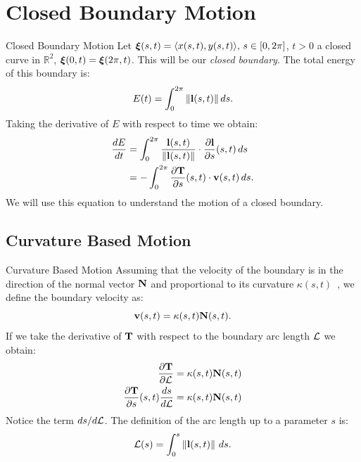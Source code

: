 \documentclass[usenames,dvipsnames]{beamer}
\begin{document}


\section{Closed Boundary Motion}
\begin{frame}{Closed Boundary Motion}
Let $\bm{\xi}(s,t) = \langle x(s,t), y(s,t) \rangle,\, s \in [0, 2\pi]$, $t >  0$ a closed curve in $\mathbb{R}^2$, \ie $\bm{\xi}(0, t) = \bm{\xi}(2\pi,t)$. This will be our \emph{closed boundary}. The total energy of this boundary is:
\begin{equation*}
    E(t) = \int_0^{2\pi} \left\lVert\mathbf{l}(s,t)\right\rVert ds.
\end{equation*}
Taking the derivative of $E$ with respect to time we obtain:
\begin{align*}
    \frac{dE}{dt} &= \int_0^{2\pi} \frac{\mathbf{l}(s,t)}{\left\lVert\mathbf{l}(s,t)\right\rVert}\cdot \frac{\partial \mathbf{l}}{\partial s}(s,t)\,ds\\
    &= -\int_0^{2\pi} \frac{\partial \mathbf{T}}{\partial s}(s,t)\cdot \mathbf{v}(s,t)\, ds.
\end{align*}
We will use this equation to understand the motion of a closed boundary.
\end{frame}

\subsection{Curvature Based Motion}
\begin{frame}{Curvature Based Motion}
Assuming that the velocity of the boundary is in the direction of the normal vector $\mathbf{N}$ and proportional to its curvature $\kappa(s,t)$~\cite{Kinderlehrer2006}, we define the boundary velocity as:
\begin{equation*}
    \mathbf{v}(s,t) = \kappa(s,t)\mathbf{N}(s,t).
\end{equation*}
If we take the derivative of $\mathbf{T}$ with respect to the boundary arc length $\mathcal{L}$ we obtain:
\begin{align}
    \frac{\partial \mathbf{T}}{\partial \mathcal{L}} &= \kappa(s,t)\mathbf{N}(s,t) \nonumber\\
    \frac{\partial \mathbf{T}}{\partial s}(s,t) \frac{ds}{d\mathcal{L}}&= \kappa(s,t)\mathbf{N}(s,t)
    \label{eq:dTds_dsdAL}
\end{align}
Notice the term $ds/d\mathcal{L}$. The definition of the arc length up to a parameter $s$ is:
\begin{equation*}
    \mathcal{L}(s) = \int_0^s \left\lVert\mathbf{l}(s,t)\right\rVert\, ds.
\end{equation*}
\end{frame}
\end{document}
